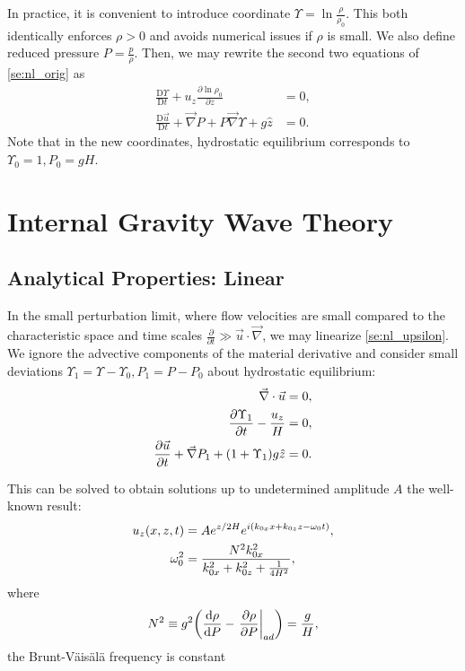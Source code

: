 \documentclass[twocolumn,
        nofootinbib, %
        usenames, %
        aps,
        prd,
        dvipsnames %
    ]{revtex4-1}%
\newcommand*{\rd}[2]{\frac{\mathrm{d}#1}{\mathrm{d}#2}}
\newcommand*{\pd}[2]{\frac{\partial#1}{\partial#2}}
\newcommand*{\md}[2]{\frac{\mathrm{D}#1}{\mathrm{D}#2}}
\newcommand*{\at}[1]{\left.#1\right|}
\DeclarePairedDelimiter\p{\lparen}{\rparen}
\begin{document}
In practice, it is convenient to introduce coordinate $\Upsilon = \ln
\frac{\rho}{\rho_0}$. This both identically enforces $\rho > 0$ and avoids
numerical issues if $\rho$ is small. We also define reduced pressure $P =
\frac{p}{\rho}$. Then, we may rewrite the second two equations of
\autoref{se:nl_orig} as
\begin{subequations}\label{se:nl_upsilon}
    \begin{align}
        \md{\Upsilon}{t} + u_z \pd{\ln \rho_0}{z} &= 0,\label{eq:nl_up_density}
            \\
        \md{\vec{u}}{t} + \vec{\nabla}P + P\vec{\nabla}\Upsilon + g\hat{z} &= 0.
    \end{align}
\end{subequations}
Note that in the new coordinates, hydrostatic equilibrium corresponds to
$\Upsilon_0 = 1, P_0 = gH$.

\section{Internal Gravity Wave Theory}\label{s:theory}

\subsection{Analytical Properties: Linear}

In the small perturbation limit, where flow velocities are small compared to the
characteristic space and time scales $\pd{}{t} \gg \vec{u} \cdot \vec{\nabla}$,
we may linearize \autoref{se:nl_upsilon}. We ignore the advective components of the
material derivative and consider small deviations $\Upsilon_1 = \Upsilon -
\Upsilon_0, P_1 = P - P_0$ about hydrostatic equilibrium:
\begin{subequations}\label{se:lin_homo}
    \begin{align}
        \vec{\nabla} \cdot \vec{u} &= 0,\\
        \pd{\Upsilon_1}{t} - \frac{u_{z}}{H} &= 0,\\
        \pd{\vec{u}}{t} + \vec{\nabla}P_1
            + \p*{1 + \Upsilon_1} g\hat{z}
            &= 0.
    \end{align}
\end{subequations}

This can be solved to obtain solutions up to undetermined amplitude $A$ the
well-known result\cite{drazin,sutherland0}:
\begin{subequations}\label{se:lin_sol}
    \begin{align}
        u_z\p*{x, z, t} &= Ae^{z/2H}e^{i(k_{0x}x + k_{0z}z - \omega_0 t)},\\
        \omega_0^2 &= \frac{N^2k_{0x}^2}{k_{0x}^2 + k_{0z}^2 + \frac{1}{4H^2}},
            \label{eq:disp_rel}
    \end{align}
\end{subequations}
where
\begin{equation}
    N^2 \equiv g^2\p*{\rd{\rho}{P} - \at{\pd{\rho}{P}}_{ad}}
        = \frac{g}{H},
\end{equation}
the Brunt-V\"ais\"al\"a frequency is constant
\end{document}
